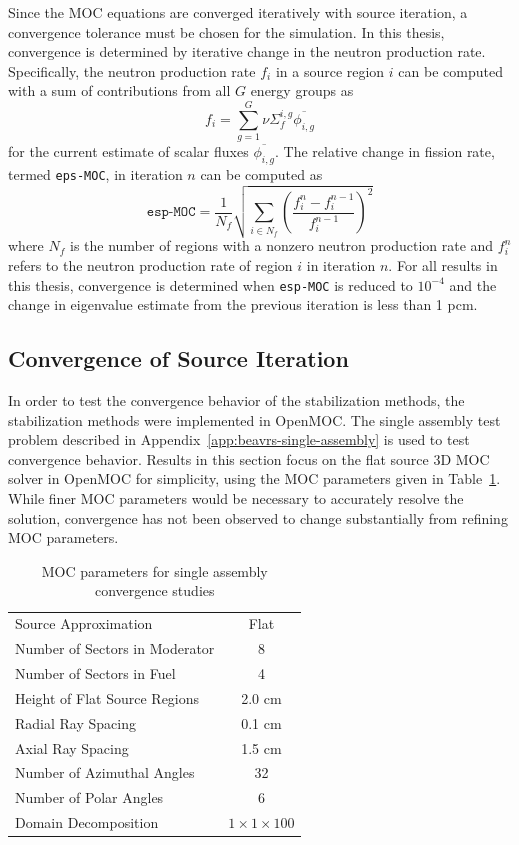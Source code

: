 Since the \ac{MOC} equations are converged iteratively with source iteration, a convergence tolerance must be chosen for the simulation. In this thesis, convergence is determined by iterative change in the neutron production rate. Specifically, the neutron production rate $f_i$ in a source region $i$ can be computed with a sum of contributions from all $G$ energy groups as
\begin{equation}
f_i = \sum_{g=1}^G \nu \Sigma_f^{i,g} \overline{\phi_{i,g}}
\end{equation}
for the current estimate of scalar fluxes $\overline{\phi_{i,g}}$. The relative change in fission rate, termed \texttt{eps-MOC}, in iteration $n$ can be computed as
\begin{equation}
\texttt{esp-MOC} = \frac{1}{N_f} \sqrt{\sum_{i \in N_f} \left(\frac{f_i^n - f_i^{n-1}}{f_i^{n-1}}\right)^2}
\label{eq:eps-MOC}
\end{equation}
where $N_f$ is the number of regions with a nonzero neutron production rate and $f_i^n$ refers to the neutron production rate of region $i$ in iteration $n$. For all results in this thesis, convergence is determined when \texttt{esp-MOC} is reduced to $10^{-4}$ and the change in eigenvalue estimate from the previous iteration is less than 1 pcm. 

\subsection{Convergence of Source Iteration}
\label{sec:si-convergence}

In order to test the convergence behavior of the stabilization methods, the stabilization methods were implemented in OpenMOC. The single assembly test problem described in Appendix~\ref{app:beavrs-single-assembly} is used to test convergence behavior. Results in this section focus on the flat source 3D \ac{MOC} solver in OpenMOC for simplicity, using the \ac{MOC} parameters given in Table~\ref{tab:convergence-tests-params}. While finer \ac{MOC} parameters would be necessary to accurately resolve the solution, convergence has not been observed to change substantially from refining \ac{MOC} parameters.

\begin{table}[ht]
	\centering
	\caption{MOC parameters for single assembly convergence studies}
	\medskip
	\begin{tabular}{lc}
		\hline
		Source Approximation & Flat \\
		Number of Sectors in Moderator & 8 \\
		Number of Sectors in Fuel & 4 \\
		Height of Flat Source Regions & 2.0 cm \\
		Radial Ray Spacing & 0.1 cm \\
		Axial Ray Spacing & 1.5 cm \\
		Number of Azimuthal Angles & 32 \\
		Number of Polar Angles & 6 \\
		Domain Decomposition & $1 \times 1 \times 100$ \\
		\hline
	\end{tabular}
	\label{tab:convergence-tests-params}
\end{table}

